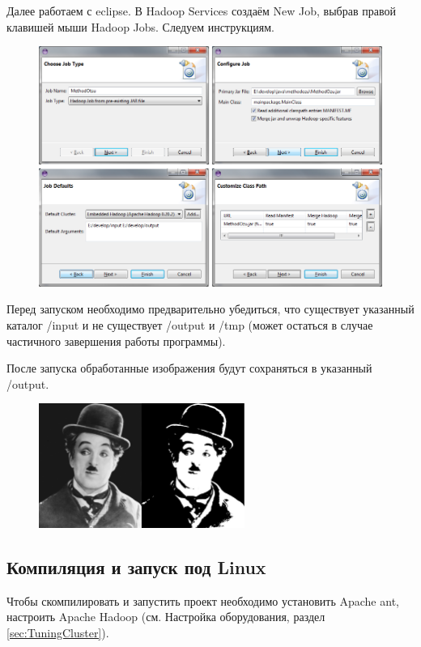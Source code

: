 \documentclass[12pt,a4paper]{extarticle} %
\begin{document}
    Далее работаем с eclipse. В Hadoop Services создаём New Job, выбрав правой клавишей мыши Hadoop Jobs. Следуем инструкциям. 
\begin{figure}[h]
    \centering
    \includegraphics[width=\textwidth]{images/eclipse-create-job.png}
\end{figure}

    Перед запуском необходимо предварительно убедиться, что существует указанный каталог /input и не существует /output и /tmp (может остаться в случае частичного завершения работы программы).

    После запуска обработанные изображения будут сохраняться в указанный /output.
\begin{figure}[h]
    \centering
    \includegraphics[width=0.6\textwidth]{images/charlie.png}
\end{figure}

\clearpage\newpage
\subsection{Компиляция и запуск под Linux}

    Чтобы скомпилировать и запустить проект необходимо установить Apache ant, настроить Apache Hadoop (см. Настройка оборудования, раздел \ref{sec:TuningCluster}).
\end{document}

